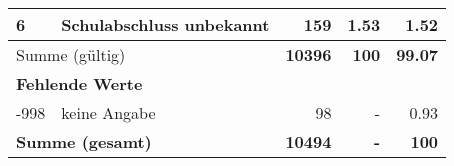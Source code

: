 \begin{longtable}{lXrrr}
     6 &
     \multicolumn{1}{X}{ Schulabschluss unbekannt   } &


       \num{159} &
       \num[round-mode=places,round-precision=2]{1.53} &
         \num[round-mode=places,round-precision=2]{1.52} \\
     \midrule
     \multicolumn{2}{l}{Summe (gültig)} &
       \textbf{\num{10396}} &
     \textbf{\num{100}} &
       \textbf{\num[round-mode=places,round-precision=2]{99.07}} \\
     \multicolumn{5}{l}{\textbf{Fehlende Werte}}\\
       -998 &
       keine Angabe &
         \num{98} &
        - &
         \num[round-mode=places,round-precision=2]{0.93} \\
     \midrule
     \multicolumn{2}{l}{\textbf{Summe (gesamt)}} &
          \textbf{\num{10494}} &
        \textbf{-} &
        \textbf{\num{100}} \\
     \bottomrule
     \end{longtable}
     
